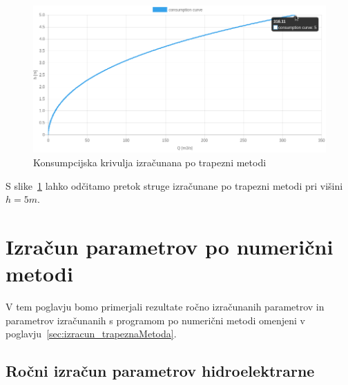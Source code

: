 \begin{figure}[H]
	\begin{centering}
		\includegraphics[width=\textwidth]{slike/izracuni/trapeznaMetoda_konsumpcijska.png}		
		\caption{Konsumpcijska krivulja izračunana po trapezni metodi}\label{fig:trapeznaMetoda_konsumpcijskaKrivulja}
	\end{centering}
\end{figure}



S slike~\ref{fig:trapeznaMetoda_konsumpcijskaKrivulja} lahko odčitamo pretok struge izračunane po trapezni metodi pri višini $h=5m$. 


\section{Izračun parametrov po numerični metodi}\label{sec:izracun_numericnaMetoda}

V tem poglavju bomo primerjali rezultate ročno izračunanih parametrov in parametrov izračunanih s programom po numerični metodi omenjeni v poglavju~\ref{sec:izracun_trapeznaMetoda}.


\subsection{Ročni izračun parametrov hidroelektrarne}\label{sec:izracun_rocno_numericnaMetoda}

